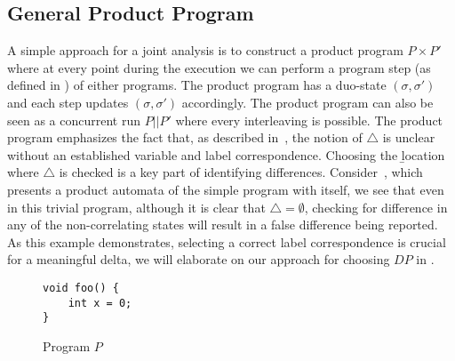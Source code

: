 \subsection{General Product Program} 
A simple approach for a joint analysis is to construct a product program $P \times P'$ where at every point during the execution we can perform a program step (as defined in ) of either programs. The product program has a duo-state $(\sigma,\sigma')$ and each step updates $(\sigma,\sigma')$ accordingly. The product program can also be seen as a concurrent run $P||P'$ where every interleaving is possible. The product program emphasizes the fact that, as described in~, the notion of $\triangle$ is unclear without an established variable and label correspondence. Choosing the \b{location} where $\triangle$ is checked is a key part of identifying differences. Consider~, which presents a product automata of the simple program with itself, we see that even in this trivial program, although it is clear that $\triangle = \emptyset$, checking for difference in any of the non-correlating states will result in a false difference being reported. As this example demonstrates, selecting a correct label correspondence is crucial for a meaningful delta, we will elaborate on our approach for choosing $DP$ in .

\begin{figure}[ht] 
\begin{lstlisting}
void foo() {
    int x = 0;
}
\end{lstlisting}
\caption{Program $P$}
\centering
\end{figure}

